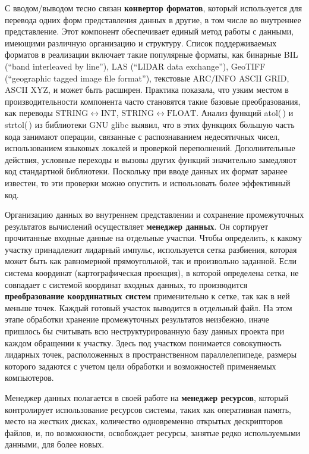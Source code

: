 \begin{multicols}{2}
   С вводом/выводом тесно связан \textbf{конвертор форматов}, который 
используется для перевода одних форм представления данных в другие, в том 
чис\-ле во внутреннее представление. Этот компонент обеспечивает единый 
метод работы с данными, име\-ющи\-ми различную организацию и структуру. 
Список поддерживаемых форматов в реализации включает такие популярные 
форматы, как бинарные BIL (``band interleaved by line''), LAS
(``LIDAR data exchange''), GeoTIFF (``geographic tagged image file format''), 
текстовые ARC/INFO ASCII GRID, 
ASCII XYZ, и может быть расширен. Практика показала, что узким местом в 
про\-из\-во\-ди\-тель\-ности компонента часто становятся такие базовые 
преобразования, как переводы $\mathrm{STRING}\leftrightarrow 
\mathrm{INT}$, $\mathrm{STRING}\leftrightarrow \mathrm{FLOAT}$. Анализ 
функций atol(\,) и strtol(\,) из библиотеки GNU glibc выявил, что в этих 
функциях б$\acute{\mbox{о}}$льшую часть кода занимают операции, связанные с 
распознаванием недесятичных чисел, использованием языковых локалей и 
проверкой переполнений. Дополнительные действия, условные переходы и 
вызовы других функций значительно замедляют код стандартной библиотеки. 
Поскольку при вводе данных их формат заранее известен, то эти проверки 
можно опустить и использовать более эффективный код.
   
   Организацию данных во внутреннем пред\-став\-ле\-нии и сохранение 
промежуточных результатов вычислений осуществляет \textbf{менеджер 
данных}. Он сортирует прочитанные входные данные на отдельные участки. 
Чтобы определить, к какому участку принадлежит лидарный импульс, 
используется сетка разбиения, которая может быть как равномерной 
прямоугольной, так и произвольно заданной. Если система координат 
(картографическая проекция), в которой определена сетка, не совпадает с 
системой координат входных данных, то производится \textbf{преобразование 
координатных систем} применительно к сетке, так как в ней меньше точек. 
Каждый готовый участок выводится в отдельный файл. На этом этапе 
обработки хранение промежуточных результатов неизбежно, иначе пришлось 
бы считывать всю неструктурированную базу данных проекта при каждом 
обращении к участку. Здесь под участком понимается совокупность лидарных 
точек, расположенных в пространственном параллелепипеде, размеры которого 
задаются с учетом цели обработки и возможностей применяемых компьютеров.
   
   Менеджер данных полагается в своей работе на \textbf{менеджер ресурсов}, 
который контролирует использование ресурсов системы, таких как оперативная 
память, место на жестких дисках, количество одновременно открытых 
дескрипторов файлов, и, по возможности, освобождает ресурсы, занятые редко 
используемыми данными, для более новых.
   

\end{multicols}
